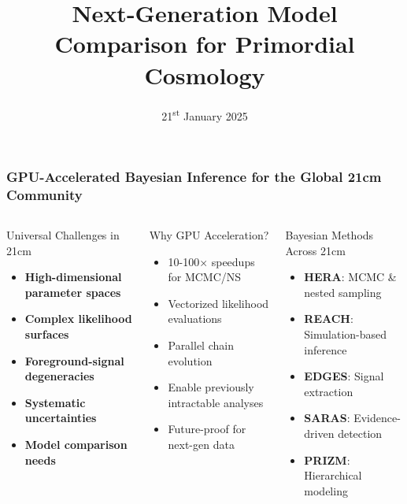 \documentclass[aspectratio=169]{beamer}
\title{Next-Generation Model Comparison for Primordial Cosmology}
\date{21\textsuperscript{st} January 2025}
\begin{document}
\begin{frame}
    \titlepage
\end{frame}

\begin{frame}
    \frametitle{GPU-Accelerated Bayesian Inference for the Global 21cm Community}
    \begin{columns}
        \begin{block}{Universal Challenges in 21cm}
            \begin{itemize}
                \item \textbf{High-dimensional parameter spaces}
                \item \textbf{Complex likelihood surfaces}
                \item \textbf{Foreground-signal degeneracies}
                \item \textbf{Systematic uncertainties}
                \item \textbf{Model comparison needs}
            \end{itemize}
        \end{block}
        \begin{block}{Why GPU Acceleration?}
            \begin{itemize}
                \item 10-100× speedups for MCMC/NS
                \item Vectorized likelihood evaluations
                \item Parallel chain evolution
                \item Enable previously intractable analyses
                \item Future-proof for next-gen data
            \end{itemize}
        \end{block}
        \begin{block}{Bayesian Methods Across 21cm}
            \begin{itemize}
                \item \textbf{HERA}: MCMC \& nested sampling
                \item \textbf{REACH}: Simulation-based inference
                \item \textbf{EDGES}: Signal extraction
                \item \textbf{SARAS}: Evidence-driven detection
                \item \textbf{PRIZM}: Hierarchical modeling

\end{itemize}
\end{block}
\end{columns}
\end{frame}
\end{document}
